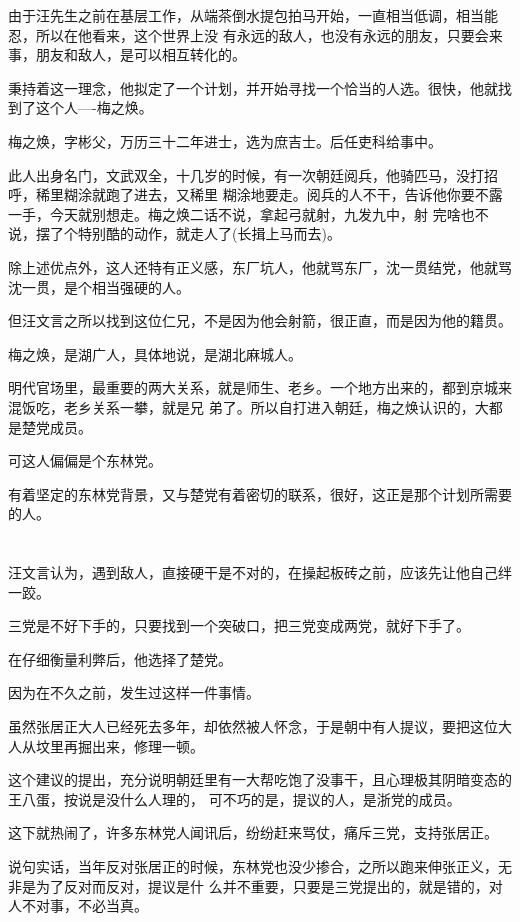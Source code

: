 \documentclass[11pt,a4paper,onecolumn]{article}
\begin{document}
由于汪先生之前在基层工作，从端茶倒水提包拍马开始，一直相当低调，相当能忍，所以在他看来，这个世界上没
有永远的敌人，也没有永远的朋友，只要会来事，朋友和敌人，是可以相互转化的。

秉持着这一理念，他拟定了一个计划，并开始寻找一个恰当的人选。很快，他就找到了这个人----梅之焕。

梅之焕，字彬父，万历三十二年进士，选为庶吉士。后任吏科给事中。

此人出身名门，文武双全，十几岁的时候，有一次朝廷阅兵，他骑匹马，没打招呼，稀里糊涂就跑了进去，又稀里
糊涂地要走。阅兵的人不干，告诉他你要不露一手，今天就别想走。梅之焕二话不说，拿起弓就射，九发九中，射
完啥也不说，摆了个特别酷的动作，就走人了(长揖上马而去)。

除上述优点外，这人还特有正义感，东厂坑人，他就骂东厂，沈一贯结党，他就骂沈一贯，是个相当强硬的人。

但汪文言之所以找到这位仁兄，不是因为他会射箭，很正直，而是因为他的籍贯。

梅之焕，是湖广人，具体地说，是湖北麻城人。

明代官场里，最重要的两大关系，就是师生、老乡。一个地方出来的，都到京城来混饭吃，老乡关系一攀，就是兄
弟了。所以自打进入朝廷，梅之焕认识的，大都是楚党成员。

可这人偏偏是个东林党。

有着坚定的东林党背景，又与楚党有着密切的联系，很好，这正是那个计划所需要的人。

\section[\thesection]{}

汪文言认为，遇到敌人，直接硬干是不对的，在操起板砖之前，应该先让他自己绊一跤。

三党是不好下手的，只要找到一个突破口，把三党变成两党，就好下手了。

在仔细衡量利弊后，他选择了楚党。

因为在不久之前，发生过这样一件事情。

虽然张居正大人已经死去多年，却依然被人怀念，于是朝中有人提议，要把这位大人从坟里再掘出来，修理一顿。

这个建议的提出，充分说明朝廷里有一大帮吃饱了没事干，且心理极其阴暗变态的王八蛋，按说是没什么人理的，
可不巧的是，提议的人，是浙党的成员。

这下就热闹了，许多东林党人闻讯后，纷纷赶来骂仗，痛斥三党，支持张居正。

说句实话，当年反对张居正的时候，东林党也没少掺合，之所以跑来伸张正义，无非是为了反对而反对，提议是什
么并不重要，只要是三党提出的，就是错的，对人不对事，不必当真。
\end{document}
